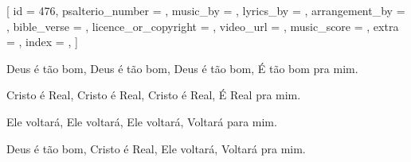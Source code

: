 % 

[
    id                     = {476},
    psalterio_number       = {},
    music_by               = {},
    lyrics_by              = {},
    arrangement_by         = {},
    bible_verse            = {},
    licence_or_copyright   = {},
    video_url              = {},
    music_score            = {},
    extra                  = {},
    index                  = {},
]


\beginverse
Deus é tão bom, Deus é tão bom,
Deus é tão bom, É tão bom pra mim.
\endverse


\beginverse
Cristo é Real, Cristo é Real,
Cristo é Real, É Real pra mim.
\endverse


\beginverse
Ele voltará, Ele voltará,
Ele voltará, Voltará para mim.
\endverse


\beginverse
Deus é tão bom, Cristo é Real,
Ele voltará, Voltará pra mim.
\endverse
\endsong